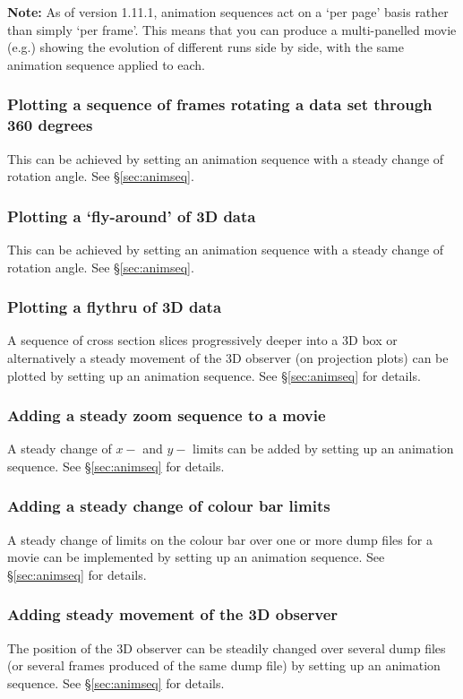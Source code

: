 \documentclass[a4paper,10pt]{article}
\begin{document}
  \textbf{Note:} As of version 1.11.1, animation sequences act on a `per page' basis rather than simply `per frame'. This means that you can produce a multi-panelled movie (e.g.) showing the evolution of different runs side by side, with the same animation sequence applied to each.

\subsubsection{ Plotting a sequence of frames rotating a data set through 360 degrees}
This can be achieved by setting an animation sequence with a steady change of rotation angle. See \S\ref{sec:animseq}.

\subsubsection{ Plotting a `fly-around' of 3D data}
This can be achieved by setting an animation sequence with a steady change of rotation angle. See \S\ref{sec:animseq}.

\subsubsection{ Plotting a flythru of 3D data}
 A sequence of cross section slices progressively deeper into a 3D box or alternatively a steady movement of the 3D observer (on projection plots) can be plotted by setting up an animation sequence. See \S\ref{sec:animseq} for details.

\subsubsection{ Adding a steady zoom sequence to a movie}
 A steady change of $x-$ and $y-$ limits can be added by setting up an animation sequence. See \S\ref{sec:animseq} for details.

\subsubsection{ Adding a steady change of colour bar limits}
 A steady change of limits on the colour bar over one or more dump files for a movie can be implemented by setting up an animation sequence. See \S\ref{sec:animseq} for details.

\subsubsection{ Adding steady movement of the 3D observer}
\label{sec:move3Dobserver}
 The position of the 3D observer can be steadily changed over several dump files (or several frames produced of the same dump file) by setting up an animation sequence.  See \S\ref{sec:animseq} for details.
\end{document}
